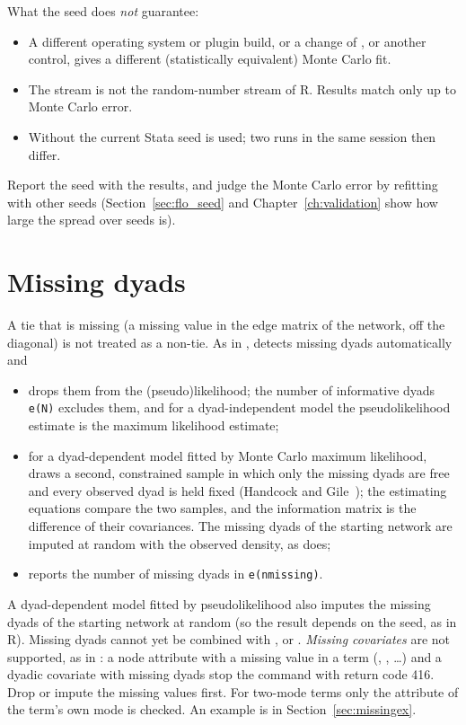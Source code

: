 What the seed does \emph{not} guarantee:
\begin{itemize}[nosep]
  \item A different operating system or plugin build, or a change of ,  or another control, gives a different (statistically equivalent) Monte Carlo fit.
  \item The stream is not the random-number stream of R. Results match \ergm{} only up to Monte Carlo error.
  \item Without  the current Stata seed is used; two runs in the same session then differ.
\end{itemize}
Report the seed with the results, and judge the Monte Carlo error by refitting with other seeds (Section~\ref{sec:flo_seed} and Chapter~\ref{ch:validation} show how large the spread over seeds is).

\section{Missing dyads}\label{sec:missing}

A tie that is missing (a missing value in the edge matrix of the network, off the diagonal) is not treated as a non-tie. As in \ergm{}, \nwergm{} detects missing dyads automatically and
\begin{itemize}[nosep]
  \item drops them from the (pseudo)likelihood; the number of informative dyads \texttt{e(N)} excludes them, and for a dyad-independent model the pseudolikelihood estimate is the maximum likelihood estimate;
  \item for a dyad-dependent model fitted by Monte Carlo maximum likelihood, draws a second, constrained sample in which only the missing dyads are free and every observed dyad is held fixed (Handcock and Gile~\cite{handcock2010}); the estimating equations compare the two samples, and the information matrix is the difference of their covariances. The missing dyads of the starting network are imputed at random with the observed density, as \ergm{} does;
  \item reports the number of missing dyads in \texttt{e(nmissing)}.
\end{itemize}
A dyad-dependent model fitted by pseudolikelihood also imputes the missing dyads of the starting network at random (so the result depends on the seed, as in R). Missing dyads cannot yet be combined with ,  or . \emph{Missing covariates} are not supported, as in \ergm{}: a node attribute with a missing value in a term (, , \ldots) and a dyadic covariate with missing dyads stop the command with return code 416. Drop or impute the missing values first. For two-mode terms only the attribute of the term's own mode is checked. An example is in Section~\ref{sec:missingex}.

